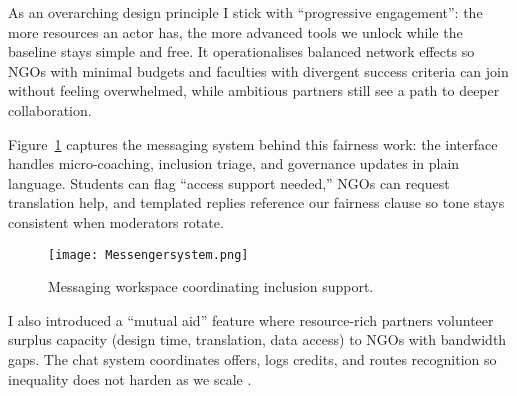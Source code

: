 As an overarching design principle I stick with ``progressive engagement'': the more resources an actor has, the more advanced tools we unlock while the baseline stays simple and free. It operationalises balanced network effects so NGOs with minimal budgets and faculties with divergent success criteria can join without feeling overwhelmed, while ambitious partners still see a path to deeper collaboration.

Figure~\ref{fig:chat-system} captures the messaging system behind this fairness work: the interface handles micro-coaching, inclusion triage, and governance updates in plain language. Students can flag ``access support needed,'' NGOs can request translation help, and templated replies reference our fairness clause so tone stays consistent when moderators rotate.

\begin{figure}[H]
  \centering
  \texttt{[image: Messengersystem.png]}
  \caption{Messaging workspace coordinating inclusion support.}
  \label{fig:chat-system}
\end{figure}

I also introduced a ``mutual aid'' feature where resource-rich partners volunteer surplus capacity (design time, translation, data access) to NGOs with bandwidth gaps. The chat system coordinates offers, logs credits, and routes recognition so inequality does not harden as we scale \citep{Lecture09}.
